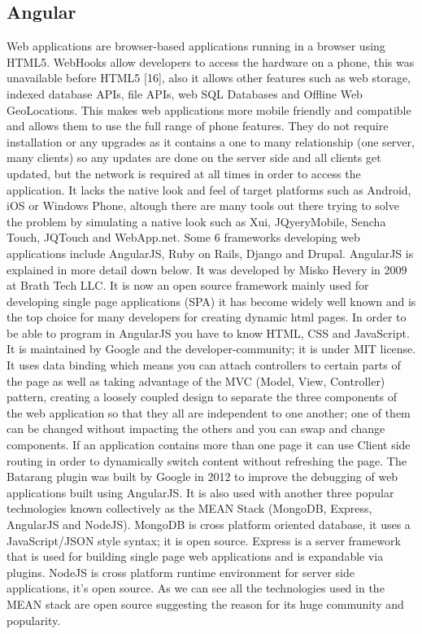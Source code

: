 \begin{itemize}
\subsection{Angular}
\bigbreak
Web applications are browser-based applications running in a browser
using HTML5. WebHooks allow developers to access the hardware on a
phone, this was unavailable before HTML5 [16], also it allows other features
such as web storage, indexed database APIs, file APIs, web SQL Databases and
Offline Web GeoLocations. This makes web applications more mobile
friendly and compatible and allows them to use the full range of phone
features. They do not require installation or any upgrades as it contains a one
to many relationship (one server, many clients) so any updates are done on
the server side and all clients get updated, but the network is required at all
times in order to access the application. It lacks the native look and feel of
target platforms such as Android, iOS or Windows Phone, altough there are
many tools out there trying to solve the problem by simulating a native look
such as Xui, JQyeryMobile, Sencha Touch, JQTouch and WebApp.net. Some
6
frameworks developing web applications include AngularJS, Ruby on Rails,
Django and Drupal. AngularJS is explained in more detail down below.
\bigbreak
It was developed by Misko Hevery in 2009 at Brath Tech LLC. It is now an
open source framework mainly used for developing single page applications
(SPA) it has become widely well known and is the top choice for many
developers for creating dynamic html pages. In order to be able to program
in AngularJS you have to know HTML, CSS and JavaScript. It is maintained by
Google and the developer-community; it is under MIT license. It uses
data binding which means you can attach controllers to certain parts of the
page as well as taking advantage of the MVC (Model, View, Controller)
pattern, creating a loosely coupled design to separate the three components
of the web application so that they all are independent to one another; one of
them can be changed without impacting the others and you can swap and
change components. If an application contains more than one page it can use
Client side routing in order to dynamically switch content without refreshing
the page. The Batarang plugin was built by Google in 2012 to improve
the debugging of web applications built using AngularJS. It is also used with
another three popular technologies known collectively as the MEAN Stack
(MongoDB, Express, AngularJS and NodeJS). MongoDB is cross platform
oriented database, it uses a JavaScript/JSON style syntax; it is open source.
Express is a server framework that is used for building single page web
applications and is expandable via plugins. NodeJS is cross platform runtime
environment for server side applications, it’s open source. As we can see all
the technologies used in the MEAN stack are open source suggesting the
reason for its huge community and popularity.


\end{itemize}
